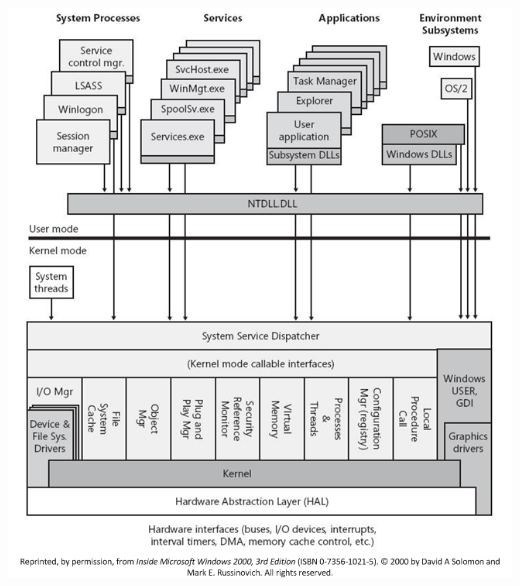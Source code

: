 \documentclass{article}
\begin{document}
\includegraphics[scale=0.4]{ms_hardware_interfaces.png}

\printbibliography
\end{document}
